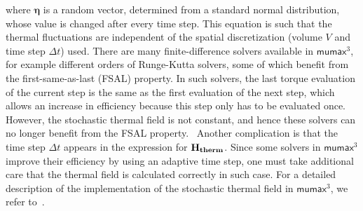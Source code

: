 \documentclass[12pt,a4paper]{article}
\renewcommand{\vec}[1]{\boldsymbol{#1}}
\newcommand{\mumax}{$\mathsf{mumax}^3$}
\begin{document}
where $\vec{\eta}$ is a random vector, determined from a standard normal distribution, whose value is changed after every time step. This equation is such that the thermal fluctuations are independent of the spatial discretization (volume $V$ and time step $\Delta t$) used.
There are many finite-difference solvers available in \mumax{}, for example different orders of Runge-Kutta solvers, some of which benefit from the first-same-as-last (FSAL) property. In such solvers, the last torque evaluation of the current step is the same as the first evaluation of the next step, which allows an increase in efficiency because this step only has to be evaluated once. However, the stochastic thermal field is not constant, and hence these solvers can no longer benefit from the FSAL property.~\cite{LEL-17b} Another complication is that the time step $\Delta t$ appears in the expression for $\vb{H_{therm}}$. Since some solvers in \mumax{} improve their efficiency by using an adaptive time step, one must take additional care that the thermal field is calculated correctly in such case. For a detailed description of the implementation of the stochastic thermal field in \mumax{}, we refer to~\cite{LEL-17b}.

\clearpage
\end{document}
